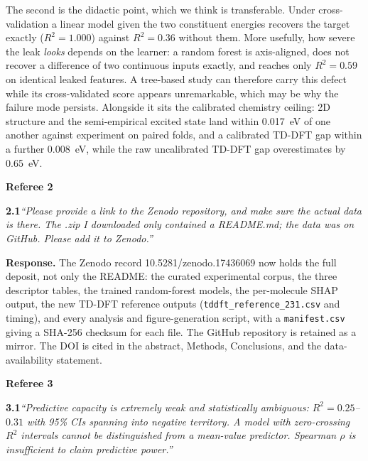 \documentclass[12pt,a4paper]{letter}
\begin{document}
The second is the didactic point, which we think is transferable. Under cross-validation a
linear model given the two constituent energies recovers the target exactly
($R^2 = \num{1.000}$) against $R^2 = \num{0.36}$ without them. More usefully, how severe
the leak \emph{looks} depends on the learner: a random forest is axis-aligned, does not
recover a difference of two continuous inputs exactly, and reaches only
$R^2 = \num{0.59}$ on identical leaked features. A tree-based study can therefore carry this defect while its
cross-validated score appears unremarkable, which may be why the failure mode persists.
Alongside it sits the calibrated chemistry ceiling: 2D structure and the semi-empirical
excited state land within \num{0.017}~eV of one another against experiment on paired
folds, and a calibrated TD-DFT gap within a further \num{0.008}~eV, while the raw
uncalibrated TD-DFT gap overestimates by \num{0.65}~eV.

\bigskip
\noindent\textbf{\large Referee 2}

\medskip
\noindent\textbf{2.1}\quad\textit{``Please provide a link to the Zenodo
repository, and make sure the actual data is there. The .zip I downloaded only
contained a README.md; the data was on GitHub. Please add it to Zenodo.''}

\smallskip
\noindent\textbf{Response.}
The Zenodo record 10.5281/zenodo.17436069 now holds the full deposit, not only
the README: the curated experimental corpus, the three descriptor tables, the
trained random-forest models, the per-molecule SHAP output, the new TD-DFT
reference outputs (\texttt{tddft\_reference\_231.csv} and timing), and every
analysis and figure-generation script, with a \texttt{manifest.csv} giving a
SHA-256 checksum for each file. The GitHub repository is retained as a mirror.
The DOI is cited in the abstract, Methods, Conclusions, and the data-availability
statement.

\bigskip
\noindent\textbf{\large Referee 3}

\medskip
\noindent\textbf{3.1}\quad\textit{``Predictive capacity is extremely weak and
statistically ambiguous: $R^2 = 0.25$--$0.31$ with \num{95}\% CIs spanning into
negative territory. A model with zero-crossing $R^2$ intervals cannot be
distinguished from a mean-value predictor. Spearman $\rho$ is insufficient to
claim predictive power.''}
\end{document}
